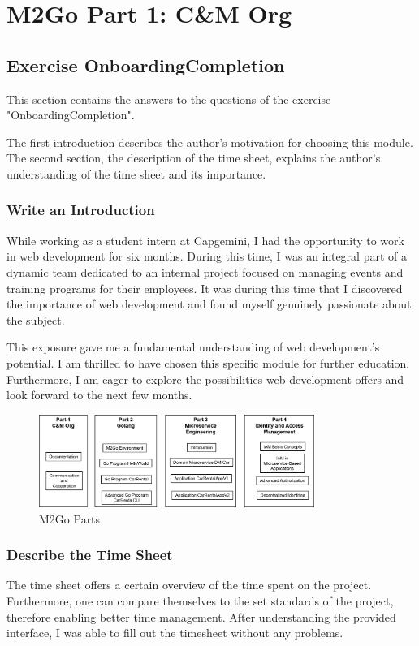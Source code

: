 \chapter{M2Go Part 1: C\&M Org}
\label{cha:cm_org}

\section{Exercise OnboardingCompletion}
This section contains the answers to the questions of the exercise "OnboardingCompletion".

The first introduction describes the author's motivation for choosing this module.
The second section, the description of the time sheet, explains the author's understanding of the time sheet and its importance.

\subsection{Write an Introduction}
While working as a student intern at Capgemini, I had the opportunity to work in web development for six months.
During this time, I was an integral part of a dynamic team dedicated to an internal project focused on managing events and training programs for their employees.
It was during this time that I discovered the importance of web development and found myself genuinely passionate about the subject.

This exposure gave me a fundamental understanding of web development's potential.
I am thrilled to have chosen this specific module for further education. 
Furthermore, I am eager to explore the possibilities web development offers and look forward to the next few months.

\begin{figure}[H]
    \centering
    \includegraphics[width=0.8\textwidth]{figures/m2go_parts.png}
    \caption{M2Go Parts}
    \label{fig:m2go_parts}
\end{figure}

\subsection{Describe the Time Sheet}
The time sheet offers a certain overview of the time spent on the project. 
Furthermore, one can compare themselves to the set standards of the project, therefore enabling better time management.
After understanding the provided interface, I was able to fill out the timesheet without any problems.

